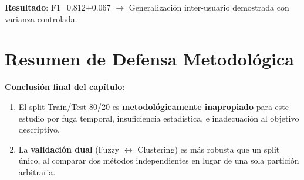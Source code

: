 \documentclass[12pt,letterpaper,twoside]{report}
\begin{document}
\begin{calculobox}
\begin{estadisticobox}
\textbf{Resultado}: F1=0.812$\pm$0.067 $\to$ Generalización inter-usuario demostrada con varianza controlada.
\end{estadisticobox}

\section{Resumen de Defensa Metodológica}

\begin{table}[H]
\centering
\caption{Comparación de Estrategias de Validación}
\label{tab:validation_comparison}
\end{table}

\begin{conclusionbox}
\textbf{Conclusión final del capítulo}:

\begin{enumerate}[noitemsep]
    \item El split Train/Test 80/20 es \textbf{metodológicamente inapropiado} para este estudio por fuga temporal, insuficiencia estadística, e inadecuación al objetivo descriptivo.
    
    \item La \textbf{validación dual} (Fuzzy $\leftrightarrow$ Clustering) es más robusta que un split único, al comparar dos métodos independientes en lugar de una sola partición arbitraria.
    

\end{enumerate}
\end{conclusionbox}
\end{calculobox}
\end{document}

